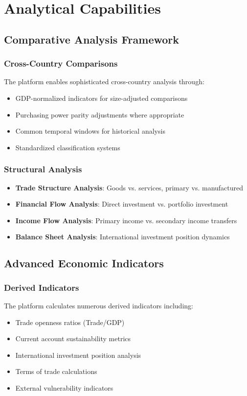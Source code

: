 \documentclass[11pt,a4paper]{article}
\begin{document}
\section{Analytical Capabilities}

\subsection{Comparative Analysis Framework}

\subsubsection{Cross-Country Comparisons}
The platform enables sophisticated cross-country analysis through:
\begin{itemize}
    \item GDP-normalized indicators for size-adjusted comparisons
    \item Purchasing power parity adjustments where appropriate
    \item Common temporal windows for historical analysis
    \item Standardized classification systems
\end{itemize}

\subsubsection{Structural Analysis}
\begin{itemize}
    \item \textbf{Trade Structure Analysis}: Goods vs. services, primary vs. manufactured
    \item \textbf{Financial Flow Analysis}: Direct investment vs. portfolio investment
    \item \textbf{Income Flow Analysis}: Primary income vs. secondary income transfers
    \item \textbf{Balance Sheet Analysis}: International investment position dynamics
\end{itemize}

\subsection{Advanced Economic Indicators}

\subsubsection{Derived Indicators}
The platform calculates numerous derived indicators including:
\begin{itemize}
    \item Trade openness ratios (Trade/GDP)
    \item Current account sustainability metrics
    \item International investment position analysis
    \item Terms of trade calculations
    \item External vulnerability indicators
\end{itemize}
\end{document}
